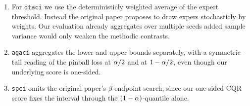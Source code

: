 \begin{enumerate}

  \item For \texttt{dtaci} we use the deterministicly weighted average of the expert threshold. Instead the original paper proposes to draw expers stochasticly by weights. Our evaluation already aggregates over multiple seeds added sample variance would only weaken the methodic contrasts. 


  \item \texttt{agaci} aggregates the lower and upper bounds separately, with
  a symmetric-tail reading of the pinball loss at $\alpha/2$ and at
  $1-\alpha/2$, even though our underlying score is one-sided.

  \item \texttt{spci} omits the original paper's $\beta$ endpoint search,
  since our one-sided CQR score fixes the interval through the
  $(1-\alpha)$-quantile alone.


\end{enumerate}
